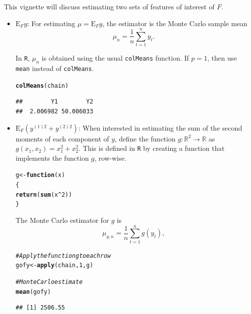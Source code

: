 \documentclass[11pt]{article}\usepackage[]{graphicx}\usepackage[]{color}
\makeatletter
\newcommand{\hlnum}[1]{\textcolor[rgb]{0.686,0.059,0.569}{#1}}%
\newcommand{\hlcom}[1]{\textcolor[rgb]{0.678,0.584,0.686}{\textit{#1}}}%
\newcommand{\hlopt}[1]{\textcolor[rgb]{0,0,0}{#1}}%
\newcommand{\hlstd}[1]{\textcolor[rgb]{0.345,0.345,0.345}{#1}}%
\newcommand{\hlkwa}[1]{\textcolor[rgb]{0.161,0.373,0.58}{\textbf{#1}}}%
\newcommand{\hlkwb}[1]{\textcolor[rgb]{0.69,0.353,0.396}{#1}}%
\newcommand{\hlkwc}[1]{\textcolor[rgb]{0.333,0.667,0.333}{#1}}%
\newcommand{\hlkwd}[1]{\textcolor[rgb]{0.737,0.353,0.396}{\textbf{#1}}}%
\newenvironment{kframe}{%
 \def\at@end@of@kframe{}%
 \ifinner\ifhmode%
  \def\at@end@of@kframe{\end{minipage}}%
  \begin{minipage}{\columnwidth}%
 \fi\fi%
 \def\FrameCommand##1{\hskip\@totalleftmargin \hskip-\fboxsep
 \colorbox{shadecolor}{##1}\hskip-\fboxsep
     \hskip-\linewidth \hskip-\@totalleftmargin \hskip\columnwidth}%
 \MakeFramed {\advance\hsize-\width
   \@totalleftmargin\z@ \linewidth\hsize
   \@setminipage}}%
 {\par\unskip\endMakeFramed%
 \at@end@of@kframe}
\newenvironment{knitrout}{}{} %
\makeatother
\begin{document}
\bigskip
This vignette will discuss estimating two sets of features of interest of $F$.
\begin{itemize}
\item $\text{E}_F y$: For estimating $\mu = \text{E}_Fy$, the estimator is the Monte Carlo sample mean
\[ \mu_n = \dfrac{1}{n} \displaystyle \sum_{t=1}^{n} y_t.\]

In \texttt{R}, $\mu_n$ is obtained using the usual \texttt{colMeans} function. If $p = 1$, then use \texttt{mean} instead of \texttt{colMeans}.

\begin{knitrout}
\color{fgcolor}\begin{kframe}
\begin{alltt}
\hlkwd{colMeans}\hlstd{(chain)}
\end{alltt}
\begin{verbatim}
##        Y1        Y2 
##  2.006982 50.006033
\end{verbatim}
\end{kframe}
\end{knitrout}
  
\item $\text{E}_F \left(y^{(1)2} + y^{(2)2} \right)$: When interested in estimating the sum of the second moments of each component of $y$,  define the function $g: \mathbb{R}^2 \to \mathbb{R}$ as $g(x_1,x_2) = x_1^2 + x_2^2$. This is defined in \texttt{R} by creating a function that implements the function $g$, row-wise.

\begin{knitrout}
\color{fgcolor}\begin{kframe}
\begin{alltt}
\hlstd{g} \hlkwb{<-} \hlkwa{function}\hlstd{(}\hlkwc{x}\hlstd{)}
\hlstd{\{}
  \hlkwd{return}\hlstd{(}\hlkwd{sum}\hlstd{(x}\hlopt{^}\hlnum{2}\hlstd{))}
\hlstd{\}}
\end{alltt}
\end{kframe}
\end{knitrout}

The Monte Carlo estimator for $g$ is 
\[ \mu_{g,n} = \dfrac{1}{n} \displaystyle \sum_{t=1}^{n} g(y_t),\]

\begin{knitrout}
\color{fgcolor}\begin{kframe}
\begin{alltt}
\hlcom{# Apply the function g to each row}
\hlstd{gofy} \hlkwb{<-} \hlkwd{apply}\hlstd{(chain,} \hlnum{1}\hlstd{, g)}

\hlcom{# Monte Carlo estimate}
\hlkwd{mean}\hlstd{(gofy)}
\end{alltt}
\begin{verbatim}
## [1] 2506.55
\end{verbatim}
\end{kframe}
\end{knitrout}
\end{itemize}
\end{document}
